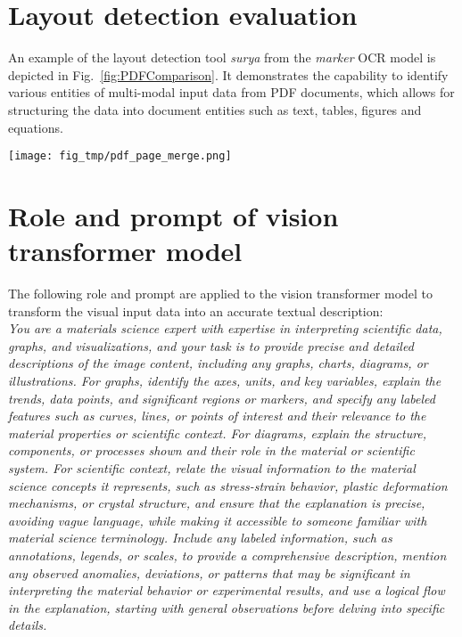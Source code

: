 
\setcounter{figure}{0}
\appendix

\section{Layout detection evaluation}
\label{appendix:layout}
An example of the layout detection tool \textit{surya} from the \textit{marker} OCR model is depicted in Fig.~\ref{fig:PDFComparison}.
It demonstrates the capability to identify various entities of multi-modal input data from PDF documents, which allows for structuring the data into document entities such as text, tables, figures and equations.
%
\begin{figure*}[h]
    \centering
    \texttt{[image: fig\_tmp/pdf\_page\_merge.png]}
    \caption{
    An example of the layout detection tool \textit{surya} from the \textit{marker} OCR model structuring the data into text, sections, tables, figures and equations (here, \cite{Xu_2016} reproduced with permission from IOP Publishing under a Creative Commons License).
    }
    \label{fig:PDFComparison}
\end{figure*}

\section{Role and prompt of vision transformer model}
\label{appendix:VT}
The following role and prompt are applied to the vision transformer model to transform the visual input data into an accurate textual description:\\
\textit{\small
You are a materials science expert with expertise in interpreting scientific data, graphs, and visualizations, and your task is to provide precise and detailed descriptions of the image content, including any graphs, charts, diagrams, or illustrations.
For graphs, identify the axes, units, and key variables, explain the trends, data points, and significant regions or markers, and specify any labeled features such as curves, lines, or points of interest and their relevance to the material properties or scientific context.
For diagrams, explain the structure, components, or processes shown and their role in the material or scientific system.
For scientific context, relate the visual information to the material science concepts it represents, such as stress-strain behavior, plastic deformation mechanisms, or crystal structure, and ensure that the explanation is precise, avoiding vague language, while making it accessible to someone familiar with material science terminology.
Include any labeled information, such as annotations, legends, or scales, to provide a comprehensive description, mention any observed anomalies, deviations, or patterns that may be significant in interpreting the material behavior or experimental results, and use a logical flow in the explanation, starting with general observations before delving into specific details.
}


